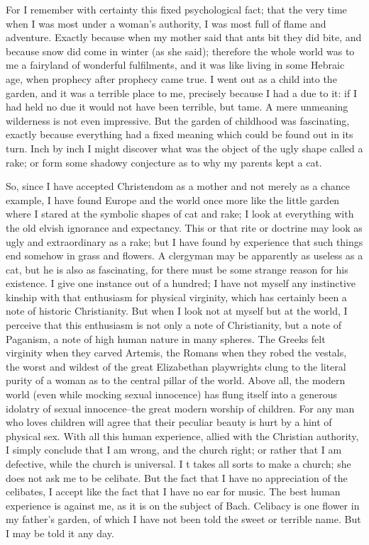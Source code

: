 \documentclass{book}
\begin{document}
For I remember with certainty this fixed psychological fact; that the very time when I was most under a woman’s authority, I was most full of flame and adventure. Exactly because when my mother said that ants bit they did bite, and because snow did come in winter (as she said); therefore the whole world was to me a fairyland of wonderful fulfilments, and it was like living in some Hebraic age, when prophecy after prophecy came true. I went out as a child into the garden, and it was a terrible place to me, precisely because I had a due to it: if I had held no due it would not have been terrible, but tame. A mere unmeaning wilderness is not even impressive. But the garden of childhood was fascinating, exactly because everything had a fixed meaning which could be found out in its turn. Inch by inch I might discover what was the object of the ugly shape called a rake; or form some shadowy conjecture as to why my parents kept a cat.

So, since I have accepted Christendom as a mother and not merely as a chance example, I have found Europe and the world once more like the little garden where I stared at the symbolic shapes of cat and rake; I look at everything with the old elvish ignorance and expectancy. This or that rite or doctrine may look as ugly and extraordinary as a rake; but I have found by experience that such things end somehow in grass and flowers. A clergyman may be apparently as useless as a cat, but he is also as fascinating, for there must be some strange reason for his existence. I give one instance out of a hundred; I have not myself any instinctive kinship with that enthusiasm for physical virginity, which has certainly been a note of historic Christianity. But when I look not at myself but at the world, I perceive that this enthusiasm is not only a note of Christianity, but a note of Paganism, a note of high human nature in many spheres. The Greeks felt virginity when they carved Artemis, the Romans when they robed the vestals, the worst and wildest of the great Elizabethan playwrights clung to the literal purity of a woman as to the central pillar of the world. Above all, the modern world (even while mocking sexual innocence) has flung itself into a generous idolatry of sexual innocence–the great modern worship of children. For any man who loves children will agree that their peculiar beauty is hurt by a hint of physical sex. With all this human experience, allied with the Christian authority, I simply conclude that I am wrong, and the church right; or rather that I am defective, while the church is universal. I t takes all sorts to make a church; she does not ask me to be celibate. But the fact that I have no appreciation of the celibates, I accept like the fact that I have no ear for music. The best human experience is against me, as it is on the subject of Bach. Celibacy is one flower in my father’s garden, of which I have not been told the sweet or terrible name. But I may be told it any day.
\end{document}
